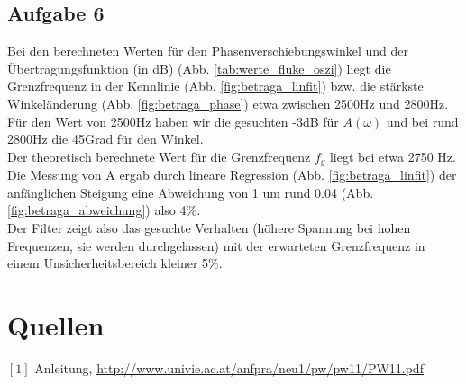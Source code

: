 \documentclass[12pt,a4paper]{article}
\begin{document}
\begin{multicols}{2}


\subsection{Aufgabe 6}

Bei den berechneten Werten für den Phasenverschiebungswinkel und der Übertragungsfunktion (in dB) (Abb. \ref{tab:werte_fluke_oszi}) liegt die Grenzfrequenz in der Kennlinie (Abb. \ref{fig:betraga_linfit}) bzw. die stärkste Winkeländerung (Abb. \ref{fig:betraga_phase}) etwa zwischen 2500Hz und 2800Hz. Für den Wert von 2500Hz haben wir die gesuchten -3dB für $A(\omega)$ und bei rund 2800Hz die 45Grad für den Winkel.\\
Der theoretisch berechnete Wert für die Grenzfrequenz $f_g$ liegt bei etwa 2750 Hz.
Die Messung von A ergab durch lineare Regression (Abb. \ref{fig:betraga_linfit}) der anfänglichen Steigung eine Abweichung von 1 um rund 0.04 (Abb. \ref{fig:betraga_abweichung}) also 4\%.\\

Der Filter zeigt also das gesuchte Verhalten (höhere Spannung bei hohen Frequenzen, sie werden durchgelassen) mit der erwarteten Grenzfrequenz in einem Unsicherheitsbereich kleiner 5\%.


\section{Quellen}
$[1]$ Anleitung, \url{http://www.univie.ac.at/anfpra/neu1/pw/pw11/PW11.pdf}\\
\end{multicols}
\end{document}
